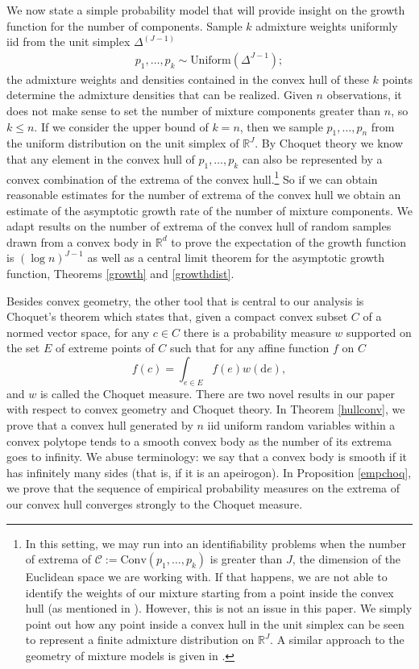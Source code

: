 \documentclass[12pt, reqno]{amsart}
\theoremstyle{definition}
\begin{document}
We now state a simple probability model that will provide insight on the growth function for the number of components. Sample $k$ admixture weights uniformly iid from the  unit simplex $\Delta^{(J-1)}$ 
\begin{align}
p_1,\ldots,p_k \sim \mbox{Uniform}(\Delta^{J-1}); \label{eq1_fmm}
\end{align}
the admixture weights and densities contained in the convex hull of these $k$ points determine the admixture densities that can be realized. 
Given $n$ observations, it does not make sense to set the number of mixture components greater than $n$, so $k \leq n$. If we consider the upper bound of $k=n$, then we sample $p_1,\ldots, p_n$  from the uniform distribution on the unit simplex of $\mathbb{R}^J$. By Choquet theory we know that any element in the convex hull of  $p_1,\ldots, p_k$  can also be represented by a convex combination of the  extrema of the convex hull.\footnote{In this setting, we may run into an identifiability problems when the number of extrema of $\mathscr{C}:=\text{Conv}(p_1,\ldots,p_k)$ is greater than $J$, the dimension of the Euclidean space we are working with. If that happens, we are not able to identify the weights of our mixture starting from a point inside the convex hull (as mentioned in \cite{lindsay}). However, this is not an issue in this paper. We simply point out how any point inside a convex hull in the unit simplex can be seen to represent a finite admixture distribution on $\mathbb{R}^J$. A similar approach to the geometry of mixture models is given in \cite{lindsay}.} So if we can obtain reasonable estimates for the number of extrema of the convex hull we obtain an estimate of the asymptotic growth rate of the number of mixture components. We adapt results on the number of extrema of the convex hull of random samples drawn from a convex body in $\mathbb{R}^d$  \cite{reitzner1} to prove the expectation of the growth function is  $(\log n)^{J-1}$ as well as a central limit theorem for the asymptotic growth function, Theorems \ref{growth} and \ref{growthdist}.

Besides convex geometry, the other tool that is central to our analysis is Choquet's theorem which states that, given a compact convex subset $C$ of a normed vector space, for any
$c \in C$ there is a probability measure $w$ supported on the set $E$ of extreme points of $C$ such that for any affine function $f$ on $C$
$$f(c) = \int_{e \in E} f(e) w(\mathrm{ d}e),$$ 
and $w$ is called the Choquet measure. There are two novel results in our paper with respect to convex geometry and Choquet theory. In Theorem \ref{hullconv}, we prove that  a convex hull generated by $n$ iid uniform random variables within a convex polytope tends to a smooth convex body as the number of  its extrema goes to infinity. We abuse
terminology: we say that a convex body is smooth if it has infinitely many sides
(that is, if it is an apeirogon). In Proposition \ref{empchoq}, we prove 
that the sequence of empirical probability measures on the extrema of our convex hull converges strongly to the Choquet measure.
\fi
\end{document}
